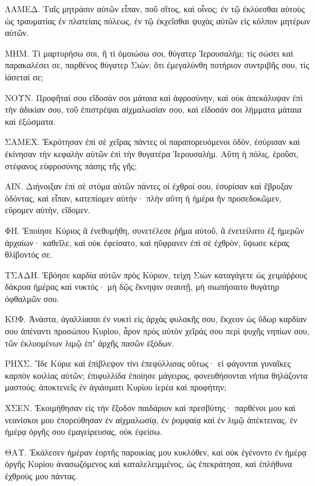 {\par }{\PP {}ΛΑΜΕΔ. Ταῖς μητράσιν αὐτῶν εἶπαν, ποῦ σῖτος, καὶ οἶνος; ἐν τῷ ἐκλύεσθαι αὐτοὺς ὡς τραυματίας ἐν πλατείαις πόλεως, ἐν τῷ ἐκχεῖσθαι ψυχὰς αὐτῶν εἰς κόλπον μητέρων αὐτῶν.
\par }{\PP {}ΜΗΜ. Τί μαρτυρήσω σοι, ἢ τί ὁμοιώσω σοι, θύγατερ Ἱερουσαλήμ; τίς σώσει καὶ παρακαλέσει σε, παρθένος θύγατερ Σιών; ὅτι ἐμεγαλύνθη ποτήριον συντριβῆς σου, τίς ἰάσεταί σε;
\par }{\PP {}ΝΟΥΝ. Προφῆταί σου εἴδοσάν σοι μάταια καὶ ἀφροσύνην, καὶ οὐκ ἀπεκάλυψαν ἐπὶ τὴν ἀδικίαν σου, τοῦ ἐπιστρέψαι αἰχμαλωσίαν σου, καὶ εἴδοσάν σοι λήμματα μάταια καὶ ἐξώσματα.
\par }{\PP {}ΣΑΜΕΧ. Ἐκρότησαν ἐπὶ σὲ χεῖρας πάντες οἱ παραπορευόμενοι ὁδὸν, ἐσύρισαν καὶ ἐκίνησαν τὴν κεφαλὴν αὐτῶν ἐπὶ τὴν θυγατέρα Ἱερουσαλήμ. Αὕτη ἡ πόλις, ἐροῦσι, στέφανος εὐφροσύνης πάσης τῆς γῆς;
\par }{\PP {}ΑΙΝ. Διήνοιξαν ἐπὶ σὲ στόμα αὐτῶν πάντες οἱ ἐχθροί σου, ἐσυρίσαν καὶ ἔβρυξαν ὀδόντας, καὶ εἶπαν, κατεπίομεν αὐτήν· πλὴν αὕτη ἡ ἡμέρα ἣν προσεδοκῶμεν, εὕρομεν αὐτὴν, εἴδομεν.
\par }{\PP {}ΦΗ. Ἐποίησε Κύριος ἃ ἐνεθυμήθη, συνετέλεσε ῥῆμα αὐτοῦ, ἃ ἐνετείλατο ἐξ ἡμερῶν ἀρχαίων· καθεῖλε, καὶ οὐκ ἐφείσατο, καὶ ηὔφρανεν ἐπὶ σὲ ἐχθρὸν, ὕψωσε κέρας θλίβοντός σε.
\par }{\PP {}ΤΣΑΔΗ. Ἐβόησε καρδία αὐτῶν πρὸς Κύριον, τείχη Σιὼν καταγάγετε ὡς χειμάῤῥους δάκρυα ἡμέρας καὶ νυκτός· μὴ δῷς ἔκνηψιν σεαυτῇ, μὴ σιωπήσαιτο θυγάτηρ ὀφθαλμῶν σου.
\par }{\PP {}ΚΩΦ. Ἀνάστα, ἀγαλλίασαι ἐν νυκτὶ εἰς ἀρχὰς φυλακῆς σου, ἔκχεον ὡς ὕδωρ καρδίαν σου ἀπέναντι προσώπου Κυρίου, ἆρον πρὸς αὐτὸν χεῖράς σου περὶ ψυχῆς νηπίων σου, τῶν ἐκλυομένων λιμῷ ἐπʼ ἀρχῆς πασῶν ἐξόδων.
\par }{\PP {}ΡΗΧΣ. Ἴδε Κύριε καὶ ἐπίβλεψον τίνι ἐπεφύλλισας οὕτως· εἰ φάγονται γυναῖκες καρπὸν κοιλίας αὐτῶν; ἐπιφυλλίδα ἐποίησε μάγειρος, φονευθήσονται νήπια θηλάζοντα μαστούς; ἀποκτενεῖς ἐν ἁγιάσματι Κυρίου ἱερέα καὶ προφήτην;
\par }{\PP {}ΧΣΕΝ. Ἐκοιμήθησαν εἰς τὴν ἔξοδον παιδάριον καὶ πρεσβύτης· παρθένοι μου καὶ νεανίσκοι μου ἐπορεύθησαν ἐν αἰχμαλωσίᾳ, ἐν ῥομφαίᾳ καὶ ἐν λιμῷ ἀπέκτεινας, ἐν ἡμέρᾳ ὀργῆς σου ἐμαγείρευσας, οὐκ ἐφείσω.
\par }{\PP {}ΘΑΥ. Ἐκάλεσεν ἡμέραν ἑορτῆς παροικίας μου κυκλόθεν, καὶ οὐκ ἐγένοντο ἐν ἡμέρᾳ ὀργῆς Κυρίου ἀνασωζόμενος καὶ καταλελειμμένος, ὡς ἐπεκράτησα, καὶ ἐπλήθυνα ἐχθρούς μου πάντας.

}

